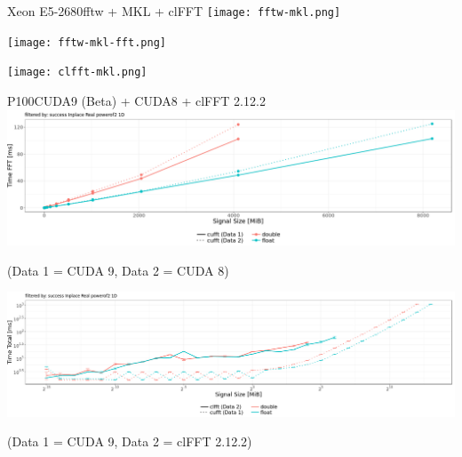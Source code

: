 \documentclass[t,11pt,hyperref={
  pdftitle = {gearshifft},
  pdfsubject = {gearshifft},
  pdfborder={0 0 0},
  colorlinks=true,
  urlcolor=red,
  citecolor=red,
  linkcolor=red,
  pdfauthor={Peter Steinbach, Matthias Werner}
  }
]{beamer}
\begin{document}
\begin{frame}{Xeon E5-2680}{fftw + MKL + clFFT}
\vspace{-0.5em} \hspace*{-2em}  \texttt{[image: fftw-mkl.png]}
  
\vspace{-2.1em} \hspace*{-2em}  \texttt{[image: fftw-mkl-fft.png]}

\vspace{-0.1em} \hspace*{-2em}  \texttt{[image: clfft-mkl.png]}
\end{frame}

\begin{frame}{P100}{CUDA9 (Beta) + CUDA8 + clFFT 2.12.2}
  \centering
  \hspace*{-2em}  \includegraphics[width=1.1\textwidth]{p100-cuda9-cuda8.png}
  
  {\scriptsize{(Data 1 = CUDA 9, Data 2 = CUDA 8)}}
  
  \hspace*{-2em}  \includegraphics[width=1.1\textwidth]{p100-clfft-cuda9.png}
  
  {\scriptsize{(Data 1 = CUDA 9, Data 2 = clFFT 2.12.2)}}
\end{frame}
\end{document}
